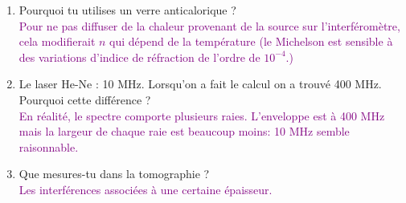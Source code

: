 \documentclass[french, a4paper, 10pt, twocolumn, landscape]{article}
\begin{document}
{\begin{enumerate}
  \item Pourquoi tu utilises un verre anticalorique ? \\
  \textcolor{purple}{Pour ne pas diffuser de la chaleur provenant de la source sur l'interféromètre, cela modifierait $n$ qui dépend de la température (le Michelson est sensible à des variations d'indice de réfraction de l'ordre de $10^{-4}$.)}
     
  \item Le laser He-Ne : 10 MHz. Lorsqu'on a fait le calcul on a trouvé 400 MHz. Pourquoi cette différence ? \\
     \textcolor{purple}{En réalité, le spectre comporte plusieurs raies. L'enveloppe est à 400 MHz mais la largeur de chaque raie est beaucoup moins: 10 MHz semble raisonnable.}

     
  \item Que mesures-tu dans la tomographie ? \\
     \textcolor{purple}{Les interférences associées à une certaine épaisseur.}
    
\end{enumerate}
}
\end{document}
